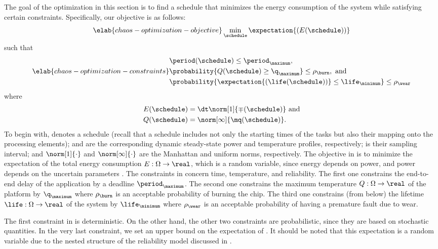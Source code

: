 The goal of the optimization in this section is to find a schedule that
minimizes the energy consumption of the system while satisfying certain
constraints. Specifically, our objective is as follows:
\begin{equation} \elab{chaos-optimization-objective}
  \min_{\schedule} \expectation{(E(\schedule))}
\end{equation}
such that
\begin{equation} \elab{chaos-optimization-constraints}
  \begin{split}
    & \period(\schedule) \leq \period_\maximum, \\
    & \probability{Q(\schedule) \geq \q_\maximum} \leq \rho_\burn, \text{ and} \\
    & \probability{\expectation{\left(\life(\schedule)\right)} \leq \life_\minimum} \leq \rho_\wear
  \end{split}
\end{equation}
where
\begin{align*}
  & E(\schedule) = \dt \norm[1]{\mp(\schedule)} \text{ and} \\
  & Q(\schedule) = \norm[\infty]{\mq(\schedule)}.
\end{align*}
To begin with, \schedule denotes a schedule (recall that a schedule includes not
only the starting times of the tasks but also their mapping onto the processing
elements); \mp and \mq are the corresponding dynamic steady-state power and
temperature profiles, respectively; \dt is their sampling interval; and
$\norm[1]{\cdot}$ and $\norm[\infty]{\cdot}$ are the Manhattan and uniform
norms, respectively. The objective in  is to
minimize the expectation of the total energy consumption $E: \Omega \to \real$,
which is a random variable, since energy depends on power, and power depends on
the uncertain parameters \vu. The constraints in
 concern time, temperature, and
reliability. The first one constrains the end-to-end delay \period of the
application by a deadline $\period_\maximum$. The second one constrains the
maximum temperature $Q: \Omega \to \real$ of the platform by $\q_\maximum$ where
$\rho_\burn$ is an acceptable probability of burning the chip. The third one
constrains (from below) the lifetime $\life: \Omega \to \real$ of the system by
$\life_\minimum$ where $\rho_\wear$ is an acceptable probability of having a
premature fault due to wear.

The first constraint in  is deterministic.
On the other hand, the other two constraints are probabilistic, since they are
based on stochastic quantities. In the very last constraint, we set an upper
bound on the expectation of \life. It should be noted that this expectation is a
random variable \perse due to the nested structure of the reliability model
discussed in .

